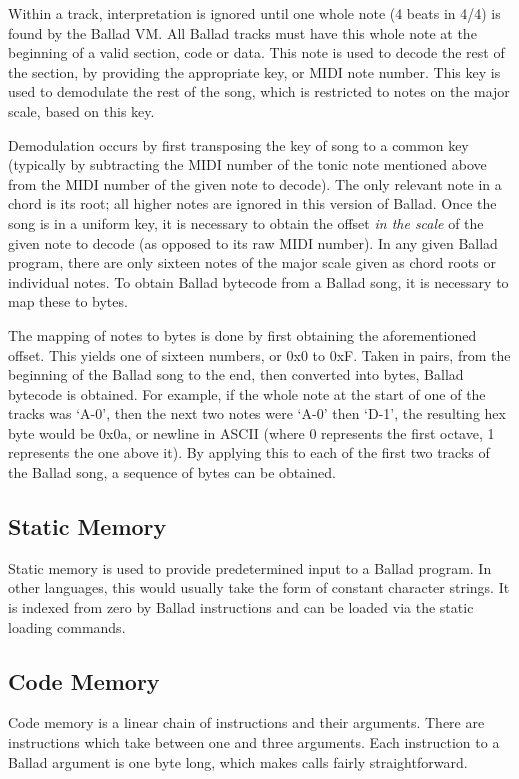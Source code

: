 Within a track, interpretation is ignored until one whole note (4 beats in 4/4)
is found by the Ballad VM. All Ballad tracks must have this whole note at the
beginning of a valid section, code or data. This note is used to decode the
rest of the section, by providing the appropriate key, or MIDI note number.
This key is used to demodulate the rest of the song, which is restricted to
notes on the major scale, based on this key.

Demodulation occurs by first transposing the key of song to a common key
(typically by subtracting the MIDI number of the tonic note mentioned above
from the MIDI number of the given note to decode). The only relevant note in a
chord is its root; all higher notes are ignored in this version of Ballad. Once
the song is in a uniform key, it is necessary to obtain the offset \emph{in the
scale} of the given note to decode (as opposed to its raw MIDI number). In any
given Ballad program, there are only sixteen notes of the major scale given as
chord roots or individual notes. To obtain Ballad bytecode from a Ballad song,
it is necessary to map these to bytes.

The mapping of notes to bytes is done by first obtaining the aforementioned
offset. This yields one of sixteen numbers, or 0x0 to 0xF. Taken in pairs, from
the beginning of the Ballad song to the end, then converted into bytes, Ballad
bytecode is obtained. For example, if the whole note at the start of one of the
tracks was `A-0', then the next two notes were `A-0' then `D-1', the resulting
hex byte would be 0x0a, or newline in ASCII (where 0 represents the first
octave, 1 represents the one above it). By applying this to each of the first
two tracks of the Ballad song, a sequence of bytes can be obtained.

\subsection{Static Memory} Static memory is used to provide predetermined input
to a Ballad program. In other languages, this would usually take the form of
constant character strings. It is indexed from zero by Ballad instructions and
can be loaded via the static loading commands.

\subsection{Code Memory} Code memory is a linear chain of instructions and
their arguments. There are instructions which take between one and three
arguments. Each instruction to a Ballad argument is one byte long, which makes
calls fairly straightforward.

